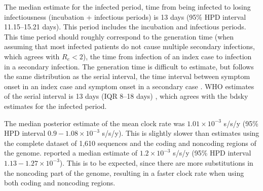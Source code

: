 	The median estimate for the infected period, time from being infected to losing infectiousness (\ie incubation + infectious periods) is 13 days (95\% HPD interval 11.15--15.21 days). This period includes the incubation and infectious periods. This time period should roughly correspond to the generation time (when assuming that most infected patients do not cause multiple secondary infections, which agrees with $R_e < 2$), the time from infection of an index case to infection in a secondary infection. The generation time is difficult to estimate, but follows the same distribution as the serial interval, the time interval between symptom onset in an index case and symptom onset in a secondary case \citep{WHO2014NEJM}. 
	WHO estimates of the serial interval is 13 days (IQR 8--18 days) \citep{WHO2015NEJM}, which agrees with the bdsky estimates for the infected period.

	The median posterior estimate of the mean clock rate was $1.01 \times 10^{-3}$ s/s/y (95\% HPD interval $0.9-1.08 \times 10^{-3}$ s/s/y). This is slightly slower than estimates using the complete dataset of 1,610 sequences and the coding and noncoding regions of the genome. \citet{Holmes2016Nature} reported a median estimate of $1.2 \times 10^{-3}$ s/s/y (95\% HPD interval $1.13-1.27 \times 10^{-3}$). This is to be expected, since there are more substitutions in the noncoding part of the genome, resulting in a faster clock rate when using both coding and noncoding regions.


